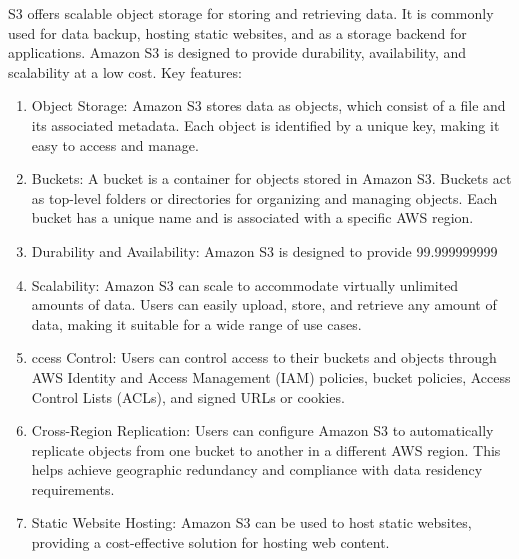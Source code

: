 \documentclass[11pt,a4paper,oneside]{report}
\begin{document}
S3 offers scalable object storage for storing and retrieving data. It is commonly used for data backup, hosting static websites, and as a storage backend for applications.
Amazon S3 is designed to provide durability, availability, and scalability at a low cost.
Key features:
\begin{enumerate}
  \item Object Storage: Amazon S3 stores data as objects, which consist of a file and its associated metadata. Each object is identified by a unique key, making it easy to access and manage.
  \item Buckets: A bucket is a container for objects stored in Amazon S3. Buckets act as top-level folders or directories for organizing and managing objects. Each bucket has a unique name and is associated with a specific AWS region.
  \item Durability and Availability: Amazon S3 is designed to provide 99.999999999%
  \item Scalability: Amazon S3 can scale to accommodate virtually unlimited amounts of data. Users can easily upload, store, and retrieve any amount of data, making it suitable for a wide range of use cases.
  \item ccess Control: Users can control access to their buckets and objects through AWS Identity and Access Management (IAM) policies, bucket policies, Access Control Lists (ACLs), and signed URLs or cookies.
  \item Cross-Region Replication: Users can configure Amazon S3 to automatically replicate objects from one bucket to another in a different AWS region. This helps achieve geographic redundancy and compliance with data residency requirements.
  \item Static Website Hosting: Amazon S3 can be used to host static websites, providing a cost-effective solution for hosting web content.
\end{enumerate}
\end{document}
